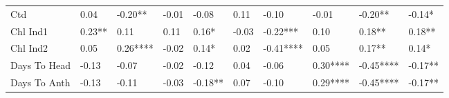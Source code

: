 \documentclass[]{article}
\begin{document}
\begin{longtable}{C{0.15\textwidth}|C{0.12\textwidth}C{0.12\textwidth}C{0.12\textwidth}C{0.12\textwidth}C{0.12\textwidth}C{0.12\textwidth}C{0.12\textwidth}C{0.12\textwidth}C{0.12\textwidth}}
  Ctd &  0.04     & -0.20**   & -0.01     & -0.08     &  0.11     & -0.10     & -0.01     & -0.20**   & -0.14*    \\ 
  Chl Ind1 &  0.23**   &  0.11     &  0.11     &  0.16*    & -0.03     & -0.22***  &  0.10     &  0.18**   &  0.18**   \\ 
  Chl Ind2 &  0.05     &  0.26**** & -0.02     &  0.14*    &  0.02     & -0.41**** &  0.05     &  0.17**   &  0.14*    \\ 
  Days To Head & -0.13     & -0.07     & -0.02     & -0.12     &  0.04     & -0.06     &  0.30**** & -0.45**** & -0.17**   \\ 
  Days To Anth & -0.13     & -0.11     & -0.03     & -0.18**   &  0.07     & -0.10     &  0.29**** & -0.45**** & -0.17**   \\ 
   \bottomrule
\end{longtable}
\end{document}
